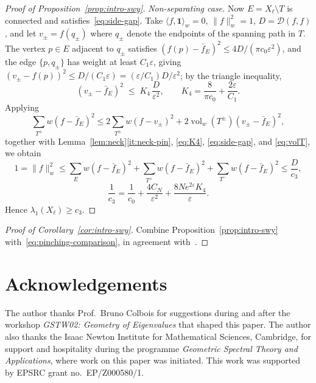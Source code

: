 \documentclass[10pt,reqno]{amsart}
\theoremstyle{remark}
\newcommand{\vol}{\operatorname{vol}}
\newcommand{\normw}[1]{\lVert #1 \rVert_{w}}
\newcommand{\DD}{\mathcal{D}}
\begin{document}
\begin{proof}[Proof of Proposition~\ref{prop:intro-swy}]
\emph{Non-separating case.} Now $E=X_\ell\setminus T$ is connected and
satisfies~\eqref{eq:side-gap}. Take $\langle f,\mathbf1\rangle_w=0$,
$\normw{f}^2=1$, $D=\DD(f,f)$, and let $v_\pm=f(q_\pm)$ where $q_\pm$ denote the endpoints of the spanning path in $T$. The vertex $p\in E$ adjacent to $q_\pm$
satisfies $(f(p)-\bar f_E)^2\le4D/(\pi c_0\varepsilon^2)$, and the edge
$\{p,q_\pm\}$ has weight at least $C_1\varepsilon$, giving
$(v_\pm-f(p))^2\le D/(C_1\varepsilon)=(\varepsilon/C_1)D/\varepsilon^2$;
by the triangle inequality,
\begin{equation}
\label{eq:K4}
  (v_\pm-\bar f_E)^2\;\le\;K_4\,\frac{D}{\varepsilon^2},
  \qquad
  K_4=\frac{8}{\pi c_0}+\frac{2\varepsilon}{C_1}.
\end{equation}
Applying
\[
\sum_{T^\pm}w(f-\bar f_E)^2
\le
2\sum_{T^\pm}w(f-v_\pm)^2
+2\vol_w(T^\pm)(v_\pm-\bar f_E)^2,
\]
together with Lemma~\ref{lem:neck}\ref{it:neck-pin},
\eqref{eq:K4}, \eqref{eq:side-gap}, and
\eqref{eq:volT}, we obtain
\[
1=\normw{f}^2
\le
\sum_Ew(f-\bar f_E)^2
+\sum_{T^+}w(f-\bar f_E)^2
+\sum_{T^-}w(f-\bar f_E)^2
\le
\frac{D}{c_3},
\]
\begin{equation}
\label{eq:c3}
  \frac1{c_3}=\frac1{c_0}+\frac{4C_N}{\varepsilon^2}
  +\frac{8Ne^{2\varepsilon}K_4}{\varepsilon}.
\end{equation}
Hence $\lambda_1(X_\ell)\ge c_3$.
\end{proof}

\begin{proof}[Proof of Corollary~\ref{cor:intro-swy}]
Combine Proposition~\ref{prop:intro-swy} with~\eqref{eq:pinching-comparison},
in agreement with~\cite{SchoenWolpertYau1980}.
\end{proof}



\section*{Acknowledgements}
The author thanks Prof.~Bruno Colbois for suggestions during and
after the workshop \emph{GSTW02: Geometry of Eigenvalues} that
shaped this paper. The author also thanks the Isaac Newton Institute
for Mathematical Sciences, Cambridge, for support and hospitality
during the programme \emph{Geometric Spectral Theory and
Applications}, where work on this paper was initiated. This work was
supported by EPSRC grant no.\ EP/Z000580/1.

\printbibliography
\end{document}
